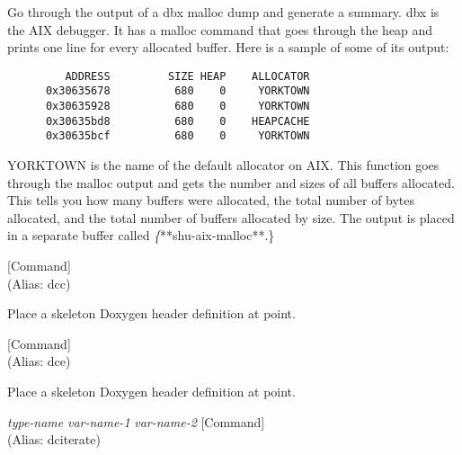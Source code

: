 \begin{doc-string}
Go through the output of a dbx malloc dump and generate a summary.  dbx is
the AIX debugger.  It has a malloc command that goes through the heap and prints
one line for every allocated buffer.  Here is a sample of some of its output:

\small{\begin{verbatim}
         ADDRESS         SIZE HEAP    ALLOCATOR
      0x30635678          680    0     YORKTOWN
      0x30635928          680    0     YORKTOWN
      0x30635bd8          680    0    HEAPCACHE
      0x30635bcf          680    0     YORKTOWN
\end{verbatim}}

YORKTOWN is the name of the default allocator on AIX.  This function goes
through the malloc output and gets the number and sizes of all buffers
allocated.  This tells you how many buffers were allocated, the total number of
bytes allocated, and the total number of buffers allocated by size.  The output
is placed in a separate buffer called \emph\{**shu-aix-malloc**.\}
\end{doc-string}

\vspace{1em}
\noindent
{}
\usebox{\funcname}
 \hfill [Command]\\%
 (Alias: dcc)

\begin{doc-string}
Place a skeleton Doxygen header definition at point.
\end{doc-string}

\vspace{1em}
\noindent
{}
\usebox{\funcname}
 \hfill [Command]\\%
 (Alias: dce)

\begin{doc-string}
Place a skeleton Doxygen header definition at point.
\end{doc-string}

\vspace{1em}
\noindent
{}
\usebox{\funcname}\emph{type-name} \emph{var-name-1} \emph{var-name-2}
 \hfill [Command]\\%
 (Alias: dciterate)

